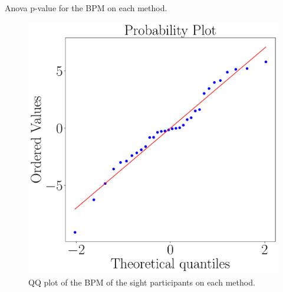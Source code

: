 \begin{table}[!htb]
    \caption{Anova p-value for the BPM on each method.}
    \label{tab:blocanova_bpm_two_way_blind_sight}
\begin{minipage}{0.45\textwidth}
    
\end{minipage}
\begin{minipage}{0.45\textwidth}
    
\end{minipage}
\end{table}

\begin{figure}[!htb]
    \centering
    \begin{minipage}{0.45\textwidth}
        \centering
        \includegraphics[width = \textwidth]{Resultados/ECG/Figuras/pdf/qqplot_bpm_two_way_sight.pdf}
        \caption{QQ plot of the BPM of the sight participants on each method.}
        \label{fig:qqplot_bpm_two_way_sight}
    \end{minipage}
    \begin{minipage}{0.075\textwidth}
        \hfill
    \end{minipage}

\end{figure}
